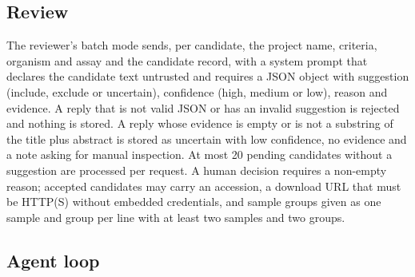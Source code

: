 \documentclass[11pt,a4paper]{article}
\begin{document}
\subsection{Review}\label{review}

The reviewer's batch mode sends, per candidate, the project name,
criteria, organism and assay and the candidate record, with a system
prompt that declares the candidate text untrusted and requires a JSON
object with suggestion (include, exclude or uncertain), confidence
(high, medium or low), reason and evidence. A reply that is not valid
JSON or has an invalid suggestion is rejected and nothing is stored. A
reply whose evidence is empty or is not a substring of the title plus
abstract is stored as uncertain with low confidence, no evidence and a
note asking for manual inspection. At most 20 pending candidates without
a suggestion are processed per request. A human decision requires a
non-empty reason; accepted candidates may carry an accession, a download
URL that must be HTTP(S) without embedded credentials, and sample groups
given as one sample and group per line with at least two samples and two
groups.

\subsection{Agent loop}\label{agent-loop}
\end{document}
